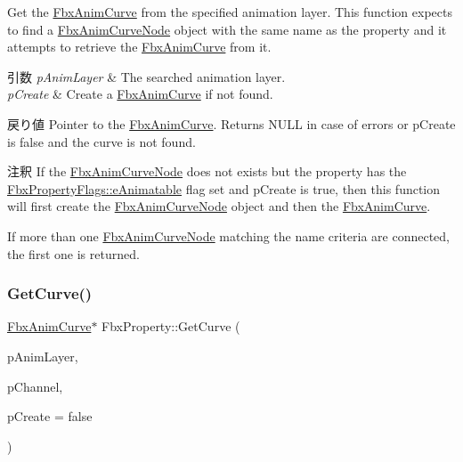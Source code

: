 Get the \hyperlink{class_fbx_anim_curve}{Fbx\+Anim\+Curve} from the specified animation layer. This function expects to find a \hyperlink{class_fbx_anim_curve_node}{Fbx\+Anim\+Curve\+Node} object with the same name as the property and it attempts to retrieve the \hyperlink{class_fbx_anim_curve}{Fbx\+Anim\+Curve} from it. 
\begin{DoxyParams}{引数}
{\em p\+Anim\+Layer} & The searched animation layer. \\
\hline
{\em p\+Create} & Create a \hyperlink{class_fbx_anim_curve}{Fbx\+Anim\+Curve} if not found. \\
\hline
\end{DoxyParams}
\begin{DoxyReturn}{戻り値}
Pointer to the \hyperlink{class_fbx_anim_curve}{Fbx\+Anim\+Curve}. Returns N\+U\+LL in case of errors or p\+Create is {\ttfamily false} and the curve is not found. 
\end{DoxyReturn}
\begin{DoxyRemark}{注釈}
If the \hyperlink{class_fbx_anim_curve_node}{Fbx\+Anim\+Curve\+Node} does not exists but the property has the \hyperlink{class_fbx_property_flags_afabfa7e0949aac8a7dcdf8a141867e99ae2c562a65bb942f3f94631794bc3d257}{Fbx\+Property\+Flags\+::e\+Animatable} flag set and p\+Create is true, then this function will first create the \hyperlink{class_fbx_anim_curve_node}{Fbx\+Anim\+Curve\+Node} object and then the \hyperlink{class_fbx_anim_curve}{Fbx\+Anim\+Curve}. 

If more than one \hyperlink{class_fbx_anim_curve_node}{Fbx\+Anim\+Curve\+Node} matching the name criteria are connected, the first one is returned. 
\end{DoxyRemark}
\mbox{\label{class_fbx_property_aac649fc614b3174b351d36d6e67e5c90}} 
\subsubsection{\texorpdfstring{Get\+Curve()}{GetCurve()}\hspace{0.1cm}{\footnotesize\ttfamily [2/3]}}
{\footnotesize\ttfamily \hyperlink{class_fbx_anim_curve}{Fbx\+Anim\+Curve}$\ast$ Fbx\+Property\+::\+Get\+Curve (\begin{DoxyParamCaption}\item[{\hyperlink{class_fbx_anim_layer}{Fbx\+Anim\+Layer} $\ast$}]{p\+Anim\+Layer,  }\item[{const char $\ast$}]{p\+Channel,  }\item[{bool}]{p\+Create = {\ttfamily false} }\end{DoxyParamCaption})}

